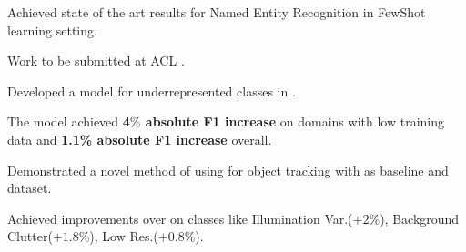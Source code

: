 


\begin{projects}
\vspace{0.2em}
   {
    \begin{myitemize}
        \item Achieved state of the art results for Named Entity Recognition in FewShot learning setting.
        \item  Work to be submitted at ACL \href{https://2021.aclweb.org/calls/papers/}{\color{accentcolor}{ACL-IJCNLP 2021}}.
    \end{myitemize}
    }

   {
    \begin{myitemize}
        \item Developed a \href{https://www.aclweb.org/anthology/D19-1432.pdf}{\color{accentcolor}{distributionally robust}} model for underrepresented classes in  \href{https://www.aclweb.org/anthology/P00-1065.pdf}{\color{accentcolor}{Semantic Role Labeling}}.
        \item The model achieved \textbf{4$\%$ absolute F1 increase} on domains with low training data and \textbf{1.1\% absolute F1 increase} overall.
    \end{myitemize}
    }
\vspace{0.3em}



    {\begin{myitemize}
        \item Demonstrated a novel method of using \href{https://arxiv.org/pdf/1710.09829.pdf}{\color{accentcolor}{capsule networks}} for object tracking with \href{https://www.robots.ox.ac.uk/~luca/siamese-fc.html}{\color{accentcolor}{SiamFC}} as baseline and \href{http://got-10k.aitestunion.com/}{\color{accentcolor}{GOT-10K}} dataset.
        \item Achieved improvements over \href{https://www.robots.ox.ac.uk/~luca/siamese-fc.html}{\color{accentcolor}{baseline}} on classes like Illumination Var.($+2\%$), Background Clutter($+1.8\%$), Low Res.($+0.8\%$). 
    \end{myitemize}}

    

\end{projects}
